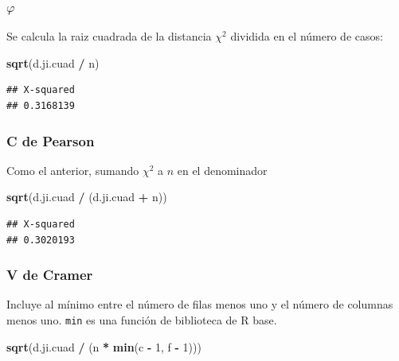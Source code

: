\documentclass[]{book}
\newenvironment{Shaded}{\begin{snugshade}}{\end{snugshade}}
\newcommand{\DecValTok}[1]{\textcolor[rgb]{0.00,0.00,0.81}{#1}}
\newcommand{\KeywordTok}[1]{\textcolor[rgb]{0.13,0.29,0.53}{\textbf{#1}}}
\newcommand{\NormalTok}[1]{#1}
\newcommand{\OperatorTok}[1]{\textcolor[rgb]{0.81,0.36,0.00}{\textbf{#1}}}
\newcommand{\StringTok}[1]{\textcolor[rgb]{0.31,0.60,0.02}{#1}}
\begin{document}
\hypertarget{varphi}{%
\subsubsection{\texorpdfstring{\(\varphi\)}{\textbackslash{}varphi}}\label{varphi}}

Se calcula la raiz cuadrada de la distancia \(\chi^{2}\) dividida en el número de casos:

\begin{Shaded}
\begin{Highlighting}[]
\KeywordTok{sqrt}\NormalTok{(d.ji.cuad }\OperatorTok{/}\StringTok{ }\NormalTok{n)}
\end{Highlighting}
\end{Shaded}

\begin{verbatim}
## X-squared 
## 0.3168139
\end{verbatim}

\hypertarget{c-de-pearson}{%
\subsubsection{C de Pearson}\label{c-de-pearson}}

Como el anterior, sumando \(\chi^{2}\) a \(n\) en el denominador

\begin{Shaded}
\begin{Highlighting}[]
\KeywordTok{sqrt}\NormalTok{(d.ji.cuad }\OperatorTok{/}\StringTok{ }\NormalTok{(d.ji.cuad }\OperatorTok{+}\StringTok{ }\NormalTok{n))}
\end{Highlighting}
\end{Shaded}

\begin{verbatim}
## X-squared 
## 0.3020193
\end{verbatim}

\hypertarget{v-de-cramer}{%
\subsubsection{V de Cramer}\label{v-de-cramer}}

Incluye al mínimo entre el número de filas menos uno y el número de columnas menos uno. \texttt{min} es una función de biblioteca de R base.

\begin{Shaded}
\begin{Highlighting}[]
\KeywordTok{sqrt}\NormalTok{(d.ji.cuad }\OperatorTok{/}\StringTok{ }\NormalTok{(n }\OperatorTok{*}\StringTok{ }\KeywordTok{min}\NormalTok{(c }\OperatorTok{-}\StringTok{ }\DecValTok{1}\NormalTok{, f }\OperatorTok{-}\StringTok{ }\DecValTok{1}\NormalTok{)))}
\end{Highlighting}
\end{Shaded}
\end{document}
